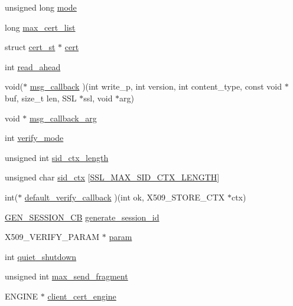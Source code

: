 \begin{DoxyCompactItemize}
unsigned long \hyperlink{structssl__ctx__st_a15675b65ff5a91cc12c75247cec9c90e}{mode}
\item 
long \hyperlink{structssl__ctx__st_a7ee4c1615f56a2034547f06d040613df}{max\-\_\-cert\-\_\-list}
\item 
struct \hyperlink{structcert__st}{cert\-\_\-st} $\ast$ \hyperlink{structssl__ctx__st_a12fd74ab996b83c38cd73136a1163471}{cert}
\item 
int \hyperlink{structssl__ctx__st_a454cbb1294b6b36ab36cff39c541ba70}{read\-\_\-ahead}
\item 
void($\ast$ \hyperlink{structssl__ctx__st_ad1c45e5a8d465d42f89a9f0d4a991dcd}{msg\-\_\-callback} )(int write\-\_\-p, int version, int content\-\_\-type, const void $\ast$buf, size\-\_\-t len, S\-S\-L $\ast$ssl, void $\ast$arg)
\item 
void $\ast$ \hyperlink{structssl__ctx__st_ad1aba043a97ea40fcb8a39e65698f8c0}{msg\-\_\-callback\-\_\-arg}
\item 
int \hyperlink{structssl__ctx__st_a31f82e30439244c12f51daff24fd40d8}{verify\-\_\-mode}
\item 
unsigned int \hyperlink{structssl__ctx__st_a59afab8285fbc901d590ab6edaa75bd0}{sid\-\_\-ctx\-\_\-length}
\item 
unsigned char \hyperlink{structssl__ctx__st_a92f94c2a4612e04ec3c075c76aae5553}{sid\-\_\-ctx} \mbox{[}\hyperlink{ssl_8h_a5cef804495c6414283f4f29d4cea0dd0}{S\-S\-L\-\_\-\-M\-A\-X\-\_\-\-S\-I\-D\-\_\-\-C\-T\-X\-\_\-\-L\-E\-N\-G\-T\-H}\mbox{]}
\item 
int($\ast$ \hyperlink{structssl__ctx__st_a60a59026ec7843603b54dbda1d46ba10}{default\-\_\-verify\-\_\-callback} )(int ok, X509\-\_\-\-S\-T\-O\-R\-E\-\_\-\-C\-T\-X $\ast$ctx)
\item 
\hyperlink{ssl_8h_aa01dfe50fd8d7cc799cad6bcf13ccfbe}{G\-E\-N\-\_\-\-S\-E\-S\-S\-I\-O\-N\-\_\-\-C\-B} \hyperlink{structssl__ctx__st_a4485f799f50830d69fa26e7514b032dc}{generate\-\_\-session\-\_\-id}
\item 
X509\-\_\-\-V\-E\-R\-I\-F\-Y\-\_\-\-P\-A\-R\-A\-M $\ast$ \hyperlink{structssl__ctx__st_a27c15c2ea4e216baacb44a5bf166cfa1}{param}
\item 
int \hyperlink{structssl__ctx__st_a325f28f265dae1b20da7c813e41bdb96}{quiet\-\_\-shutdown}
\item 
unsigned int \hyperlink{structssl__ctx__st_aab1f54a0e69246d749a6f6ad249c2176}{max\-\_\-send\-\_\-fragment}
\item 
E\-N\-G\-I\-N\-E $\ast$ \hyperlink{structssl__ctx__st_ae6bb617a63017d5c8e7eccc6f8030185}{client\-\_\-cert\-\_\-engine}

\end{DoxyCompactItemize}
